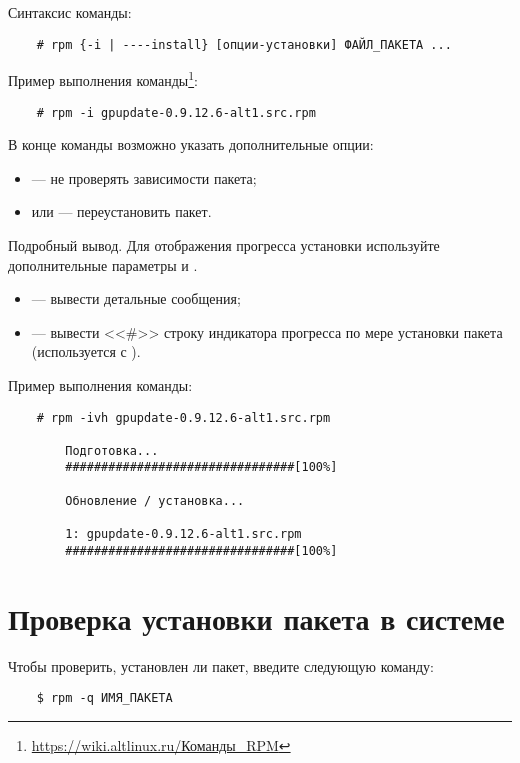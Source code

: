 Синтаксис команды:
\begin{verbatim}
    # rpm {-i | ----install} [опции-установки] ФАЙЛ_ПАКЕТА ...
\end{verbatim}


Пример выполнения команды\footnote{\href{https://wiki.altlinux.ru/\%D0\%9A\%D0\%BE\%D0\%BC\%D0\%B0\%D0\%BD\%D0\%B4\%D1\%8B_RPM}{https://wiki.altlinux.ru/Команды\_RPM}}:

\begin{verbatim}
    # rpm -i gpupdate-0.9.12.6-alt1.src.rpm
\end{verbatim}

В конце команды возможно указать дополнительные опции:
\begin{itemize}
	\item {} --- не проверять зависимости пакета;
	\item {} или  --- переустановить пакет.
\end{itemize}

Подробный вывод.
Для отображения прогресса установки используйте дополнительные параметры  и .
\begin{itemize}
	\item {} --- вывести детальные сообщения;
	\item {} --- вывести <<\#>> строку индикатора прогресса по мере установки пакета (используется с ).
\end{itemize}

Пример выполнения команды:
\begin{verbatim}
    # rpm -ivh gpupdate-0.9.12.6-alt1.src.rpm

        Подготовка...
        ################################[100%]

        Обновление / установка...

        1: gpupdate-0.9.12.6-alt1.src.rpm
        ################################[100%]
\end{verbatim}


\section{Проверка установки пакета в системе}\label{verifying-package}
Чтобы проверить, установлен ли пакет, введите следующую команду:
\begin{verbatim}
    $ rpm -q ИМЯ_ПАКЕТА
\end{verbatim}

